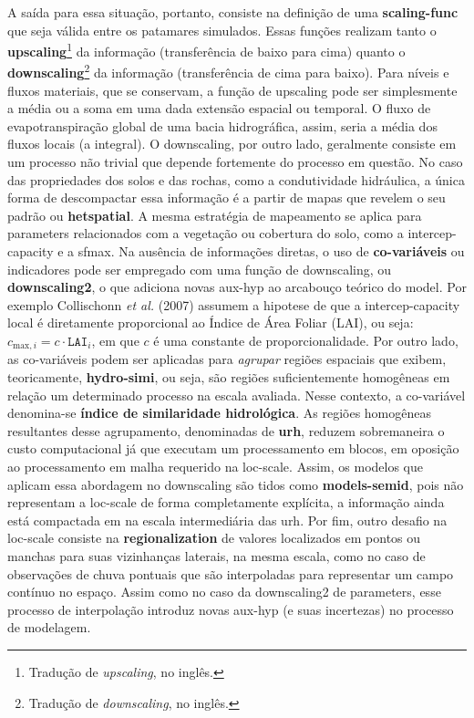 \documentclass[./main.tex]{subfiles}
\begin{document}
\par A saída para essa situação, portanto, consiste na definição de uma \textbf{\gls{scaling-func}} que seja válida entre os patamares simulados. Essas funções realizam tanto o \textbf{\gls{upscaling}}\footnote{Tradução de \textit{upscaling}, no inglês.} da informação (transferência de baixo para cima) quanto o \textbf{\gls{downscaling}}\footnote{Tradução de \textit{downscaling}, no inglês.} da informação (transferência de cima para baixo). Para níveis e fluxos materiais, que se conservam, a função de \gls{upscaling} pode ser simplesmente a média ou a soma em uma dada extensão espacial ou temporal. O fluxo de evapotranspiração global de uma bacia hidrográfica, assim, seria a média dos fluxos locais (a integral). O \gls{downscaling}, por outro lado, geralmente consiste em um processo não trivial que depende fortemente do processo em questão. No caso das propriedades dos solos e das rochas, como a condutividade hidráulica, a única forma de descompactar essa informação é a partir de mapas que revelem o seu padrão ou \textbf{\gls{hetspatial}}. A mesma estratégia de mapeamento se aplica para \gls{parameters} relacionados com a vegetação ou cobertura do solo, como a \gls{intercep-capacity} e a \gls{sfmax}. Na ausência de informações diretas, o uso de \textbf{co-variáveis} ou indicadores pode ser empregado com uma função de \gls{downscaling}, ou \textbf{\gls{downscaling2}}, o que adiciona novas \gls{aux-hyp} ao arcabouço teórico do \gls{model}. Por exemplo Collischonn \textit{et al.} (2007) \cite{Collischonn2007} assumem a \gls{hipotese} de que a \gls{intercep-capacity} local é diretamente proporcional ao Índice de Área Foliar (LAI), ou seja: $c_{\text{max}, i} = c \cdot \texttt{LAI}_{i}$, em que $c$ é uma constante de proporcionalidade. Por outro lado, as co-variáveis podem ser aplicadas para \textit{agrupar} regiões espaciais que exibem, teoricamente, \textbf{\gls{hydro-simi}}, ou seja, são regiões suficientemente homogêneas em relação um determinado processo na escala avaliada. Nesse contexto, a co-variável denomina-se \textbf{índice de similaridade hidrológica}. As regiões homogêneas resultantes desse agrupamento, denominadas de \textbf{\gls{urh}}, reduzem sobremaneira o custo computacional já que executam um processamento em blocos, em oposição ao processamento em malha requerido na \gls{loc-scale}. Assim, os modelos que aplicam essa abordagem no \gls{downscaling} são tidos como \textbf{\gls{models-semid}}, pois não representam a \gls{loc-scale} de forma completamente explícita, a informação ainda está compactada em na escala intermediária das \gls{urh}. Por fim, outro desafio na \gls{loc-scale} consiste na \textbf{\gls{regionalization}} de valores localizados em pontos ou manchas para suas vizinhanças laterais, na mesma escala, como no caso de observações de chuva pontuais que são interpoladas para representar um campo contínuo no espaço. Assim como no caso da \gls{downscaling2} de \gls{parameters}, esse processo de interpolação introduz novas \gls{aux-hyp} (e suas incertezas) no processo de modelagem.
\end{document}
